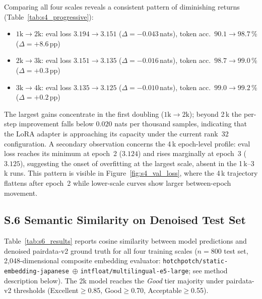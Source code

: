 ﻿\documentclass[onecolumn]{article}
\begin{document}
Comparing all four scales reveals a consistent pattern of diminishing
returns (Table~\ref{tab:s4_progressive}):
\begin{itemize}
  \item $1\text{k} \to 2\text{k}$: eval loss $3.194 \to 3.151$
        ($\Delta = {-}0.043$\,nats), token acc.\ $90.1 \to 98.7$\,\%
        ($\Delta = {+}8.6$\,pp)
  \item $2\text{k} \to 3\text{k}$: eval loss $3.151 \to 3.135$
        ($\Delta = {-}0.016$\,nats), token acc.\ $98.7 \to 99.0$\,\%
        ($\Delta = {+}0.3$\,pp)
  \item $3\text{k} \to 4\text{k}$: eval loss $3.135 \to 3.125$
        ($\Delta = {-}0.010$\,nats), token acc.\ $99.0 \to 99.2$\,\%
        ($\Delta = {+}0.2$\,pp)
\end{itemize}
The largest gains concentrate in the first doubling ($1\text{k} \to 2\text{k}$);
beyond 2\,k the per-step improvement falls below $0.020$ nats per thousand
samples, indicating that the LoRA adapter is approaching its capacity
under the current rank~32 configuration.
A secondary observation concerns the 4\,k epoch-level profile: eval loss
reaches its minimum at epoch~2 ($3.124$) and rises marginally at
epoch~3 ($3.125$), suggesting the onset of overfitting at the largest
scale, absent in the 1\,k--3\,k runs.
This pattern is visible in Figure~\ref{fig:s4_val_loss}, where the
4\,k trajectory flattens after epoch~2 while lower-scale curves show
larger between-epoch movement.

\subsection*{S.6 Semantic Similarity on Denoised Test Set}

\begin{sloppypar}
Table~\ref{tab:s6_results} reports cosine similarity between model predictions
and denoised pairdata-v2 ground truth for all four training scales
($n=800$ test set, 2{,}048-dimensional composite embedding evaluator:
\nolinkurl{hotchpotch/static-embedding-japanese}~$\oplus$
\nolinkurl{intfloat/multilingual-e5-large}; see method description below).
The 2k model reaches the \textit{Good} tier majority under pairdata-v2
thresholds (Excellent$\geq$0.85, Good$\geq$0.70, Acceptable$\geq$0.55).
\end{sloppypar}
\end{document}
